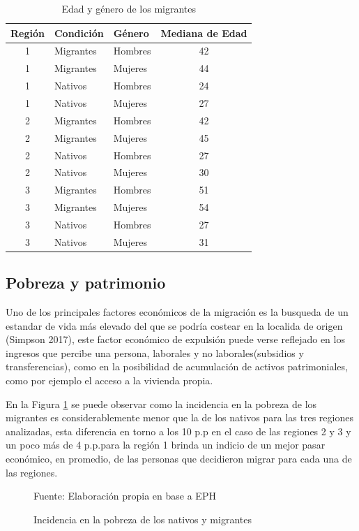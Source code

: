 \documentclass[12pt,a4paper]{article}
\begin{document}
\begin{table}[ht!]
\centering
\footnotesize
\begin{tabular}{cllc}
  \hline
Región & Condición & Género & Mediana de Edad \\ 
  \hline
  1 & Migrantes & Hombres & 42 \\ 
  1 & Migrantes & Mujeres & 44 \\ 
  1 & Nativos & Hombres & 24 \\ 
  1 & Nativos & Mujeres & 27 \\ 
  2 & Migrantes & Hombres & 42 \\ 
  2 & Migrantes & Mujeres & 45 \\ 
  2 & Nativos & Hombres & 27 \\ 
  2 & Nativos & Mujeres & 30 \\ 
  3 & Migrantes & Hombres & 51 \\ 
  3 & Migrantes & Mujeres & 54 \\ 
  3 & Nativos & Hombres & 27 \\ 
  3 & Nativos & Mujeres & 31 \\ 
   \hline
\end{tabular}
\caption{Edad y género de los migrantes} 
\label{cuadro:edad_mig}
\end{table}

\subsection{Pobreza y patrimonio}
Uno de los principales factores económicos de la migración es la busqueda de un estandar de vida más elevado del que se podría costear en la localida de origen (Simpson 2017), este factor económico de expulsión  puede verse reflejado en los ingresos que percibe una persona, laborales y no laborales(subsidios y transferencias), como en la posibilidad de acumulación de activos patrimoniales, como por ejemplo el acceso a la vivienda propia. 

En la Figura \ref{figure:pobre_mig} se puede observar como la incidencia en la pobreza de los migrantes es considerablemente menor que la de los nativos para las tres regiones analizadas, esta diferencia en torno a los 10 p.p en el caso de las regiones 2 y 3 y un poco más de 4 p.p.para la región 1 brinda un indicio de un mejor pasar económico, en promedio, de las personas que decidieron migrar para cada una de las regiones.


\begin{figure}[hb!]
\begin{center}
\caption{Incidencia en la pobreza de los nativos y migrantes}
\label{figure:pobre_mig}
 
\end{center}
\begin{flushleft}
\begin{scriptsize}
Fuente: Elaboración propia en base a EPH
\end{scriptsize}
\end{flushleft}
\end{figure}
\end{document}

